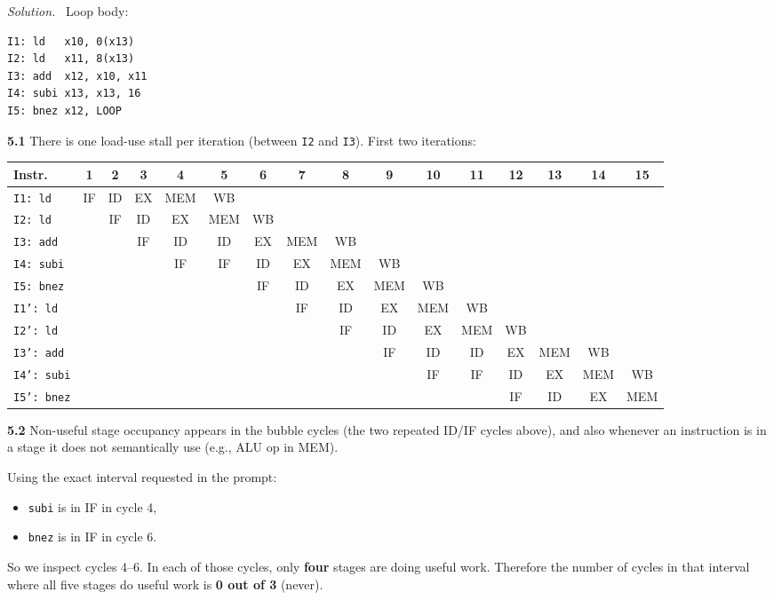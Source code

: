 \documentclass[12pt]{article}
\newenvironment{solution}{\par\noindent\textit{Solution.}\ }{\par\vspace{1.1em}}
\newcommand{\subproblem}[1]{\par\vspace{0.45em}\noindent\textbf{#1}\quad}
\begin{document}
\begin{solution}
Loop body:
\begin{verbatim}
I1: ld   x10, 0(x13)
I2: ld   x11, 8(x13)
I3: add  x12, x10, x11
I4: subi x13, x13, 16
I5: bnez x12, LOOP
\end{verbatim}

\subproblem{5.1}
There is one load-use stall per iteration (between \texttt{I2} and \texttt{I3}). First two iterations:
\begin{center}
\small
\begin{tabular}{@{}lccccccccccccccc@{}}
\toprule
Instr. & 1 & 2 & 3 & 4 & 5 & 6 & 7 & 8 & 9 & 10 & 11 & 12 & 13 & 14 & 15 \\
\midrule
\texttt{I1: ld}    & IF & ID & EX & MEM & WB &    &    &    &    &    &    &    &    &    &    \\
\texttt{I2: ld}    &    & IF & ID & EX  & MEM & WB &    &    &    &    &    &    &    &    &    \\
\texttt{I3: add}   &    &    & IF & ID  & ID  & EX & MEM & WB &    &    &    &    &    &    &    \\
\texttt{I4: subi}  &    &    &    & IF  & IF  & ID & EX  & MEM & WB &    &    &    &    &    &    \\
\texttt{I5: bnez}  &    &    &    &     &     & IF & ID  & EX  & MEM & WB &    &    &    &    &    \\
\texttt{I1': ld}   &    &    &    &     &     &    & IF  & ID  & EX  & MEM & WB &    &    &    &    \\
\texttt{I2': ld}   &    &    &    &     &     &    &     & IF  & ID  & EX  & MEM & WB &    &    &    \\
\texttt{I3': add}  &    &    &    &     &     &    &     &     & IF  & ID  & ID  & EX & MEM & WB &    \\
\texttt{I4': subi} &    &    &    &     &     &    &     &     &     & IF  & IF  & ID & EX  & MEM & WB \\
\texttt{I5': bnez} &    &    &    &     &     &    &     &     &     &     &     & IF & ID  & EX  & MEM \\
\bottomrule
\end{tabular}
\normalsize
\end{center}

\subproblem{5.2}
Non-useful stage occupancy appears in the bubble cycles (the two repeated ID/IF cycles above), and also whenever an instruction is in a stage it does not semantically use (e.g., ALU op in MEM).

Using the exact interval requested in the prompt:
\begin{itemize}
\item \texttt{subi} is in IF in cycle 4,
\item \texttt{bnez} is in IF in cycle 6.
\end{itemize}
So we inspect cycles 4--6. In each of those cycles, only \textbf{four} stages are doing useful work. Therefore the number of cycles in that interval where all five stages do useful work is \textbf{0 out of 3} (never).
\end{solution}
\end{document}
